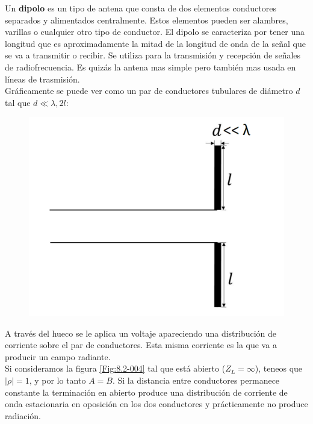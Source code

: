 \documentclass[12pt,a4paper]{article}
\begin{document}
Un \textbf{dipolo} es un tipo de antena que consta de dos elementos conductores separados y alimentados centralmente. Estos elementos pueden ser alambres, varillas o cualquier otro tipo de conductor. El dipolo se caracteriza por tener una longitud que es aproximadamente la mitad de la longitud de onda de la señal que se va a transmitir o recibir. Se utiliza para la transmisión y recepción de señales de radiofrecuencia. Es quizás la antena mas simple pero también mas usada en líneas de trasmisión. \\

Gráficamente se puede ver como un par de conductores tubulares de diámetro $d$ tal que $d\ll \lambda,2l$:


\begin{figure}[h!] \centering
\includegraphics[scale=0.5]{lineatrasmision4.png}
\end{figure}

A través del hueco se le aplica un voltaje apareciendo una distribución de corriente sobre el par de conductores. Esta misma corriente es la que va a producir un campo radiante. \\

Si consideramos la figura \ref{Fig:8.2-004} tal que está abierto ($Z_L = \infty$), teneos que $|\rho| = 1$, y por lo tanto $A=B$. Si la distancia entre conductores permanece constante la terminación en abierto produce una distribución de corriente de onda estacionaria en oposición en los dos conductores y prácticamente no produce radiación. \\
\end{document}
